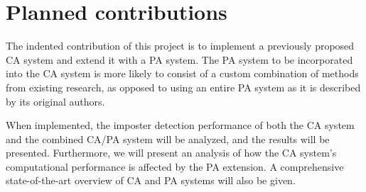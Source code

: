\documentclass[informationsecurity]{gucmasterproject}
\begin{document}
%

\section{Planned contributions}
The indented contribution of this project is to implement a previously proposed CA system \cite{mondal} and extend it with a PA system.
The PA system to be incorporated into the CA system is more likely to consist of a custom combination of methods from existing research, as opposed to using an entire PA system as it is described by its original authors.

When implemented, the imposter detection performance of both the CA system and the combined CA/PA system will be analyzed, and the results will be presented.
Furthermore, we will present an analysis of how the CA system's computational performance is affected by the PA extension.
A comprehensive state-of-the-art overview of CA and PA systems will also be given.

\end{document}
